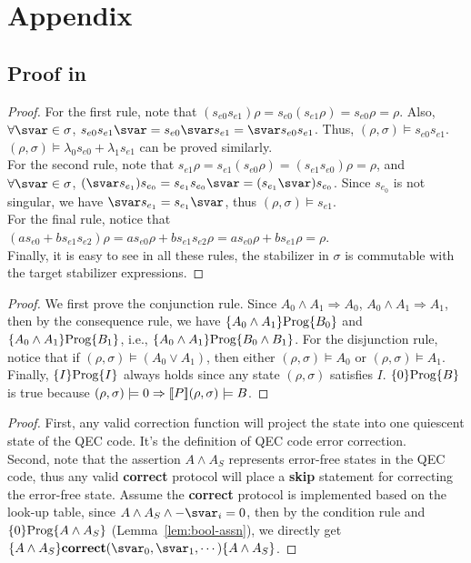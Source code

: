 \onecolumn
\section{Appendix}

\subsection{Proof in {\assnname}}
\label{app:assn}

\implictrule*
\begin{proof} 
	For the first rule, note that  $(s_{e0}s_{e1})\rho = s_{e0}(s_{e1}\rho ) = s_{e0}\rho  = \rho$. 
	Also, $\forall \svar \in \sigma$, $s_{e0}s_{e1} \svar = s_{e0}\svar s_{e1} = \svar s_{e0}s_{e1}$. Thus, $(\rho, \sigma) \models s_{e0}s_{e1}$. $(\rho, \sigma) \models \lambda_0 s_{e0} + \lambda_1 s_{e1} $ can be proved similarly. \\
	For the second rule, note that $s_{e1}\rho = s_{e1}(s_{e0}\rho ) =
	(s_{e1}s_{e0})\rho = \rho$, and $\forall \svar \in \sigma$, $(\svar s_{e_1})s_{e_0} = s_{e_1}s_{e_0}\svar = (s_{e_1}\svar) s_{e_0}$. Since $s_{e_0}$ is not singular, we have $\svar s_{e_1}= s_{e_1}\svar$, thus $(\rho, \sigma) \models s_{e1}$. \\
	For the final rule, notice that $(a s_{e0} + bs_{e1}s_{e2})\rho = a s_{e0}\rho + bs_{e1}s_{e2}\rho = a s_{e0}\rho + bs_{e1}\rho = \rho$.\\
	Finally, it is easy to see in all these rules, the stabilizer in $\sigma$ is commutable with the target stabilizer expressions. 
\end{proof}

\boolassn*
\begin{proof}
	We first prove the conjunction rule. Since $A_0\wedge A_1 \Rightarrow A_0$, $A_0\wedge A_1 \Rightarrow A_1$, then by the consequence rule, we have $\{A_0\wedge A_1\}\text{Prog}\{B_0\}$ and $\{A_0\wedge A_1\}\text{Prog}\{B_1\}$, i.e., $\{A_0\wedge A_1\}\text{Prog}\{B_0\wedge B_1\}$. For the disjunction rule, notice that if $(\rho,\sigma)\models (A_0\vee A_1)$, then either $(\rho,\sigma)\models A_0$ or $(\rho,\sigma)\models A_1$. 
	Finally,
	$\{I\}\text{Prog}\{I\}$ always holds since any state $(\rho,\sigma)$ satisfies $I$. $\{0\}\text{Prog}\{B\}$ is true because $(\rho,\sigma)\models 0 \Rightarrow [\![ P ]\!](\rho,\sigma)\models B$.
\end{proof}

\decodecorrect*
\begin{proof}
First, any valid correction function will project the state into one quiescent state of the QEC code. It's the definition of QEC code error correction. \\
Second, note that the assertion $A \wedge A_S$  represents error-free states in the QEC code, thus any valid \textbf{correct} protocol will place a \textbf{skip} statement for correcting the error-free state. 
Assume the \textbf{correct} protocol is implemented based on the look-up table, 
since $A \wedge A_S \wedge -\svar_i = 0$,
then by the condition rule and $\{0\}\text{Prog}\{A \wedge A_S\}$ (Lemma~\ref{lem:bool-assn}), we directly get $\{A \wedge A_S\}\textbf{correct}(\svar_0, \svar_1, \cdots) \{A \wedge A_S\}$.
\end{proof}



